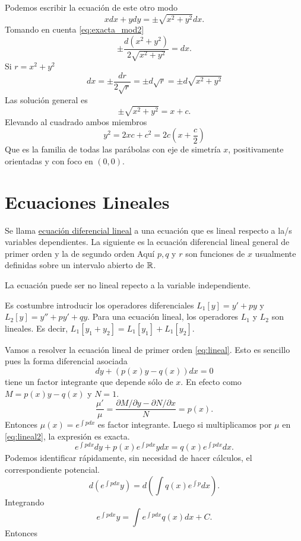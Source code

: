 Podemos escribir la ecuación de este otro modo
\[xdx+ydy=\pm\sqrt{x^2+y^2}dx.\]
Tomando en cuenta \eqref{eq:exacta_mod2}
\[\pm\frac{d(x^2+y^2)}{2\sqrt{x^2+y^2}}=dx.\]
Si $r=x^2+y^2$
\[dx=\pm\frac{dr}{2\sqrt{r}}=\pm d\sqrt{r}=\pm d\sqrt{x^2+y^2}\]
Las solución general es
\[\pm\sqrt{x^2+y^2}=x+c.\]
Elevando al cuadrado ambos miembros
\[y^2=2xc+c^2=2c\left(x+\frac{c}{2}\right)\]
Que es la familia de todas las parábolas con eje de simetría $x$, positivamente
orientadas y con foco en $(0,0)$.

\section{Ecuaciones Lineales}
\begin{definicion} Se llama \href{http://es.wikipedia.org/wiki/Ecuación_diferencial_lineal}{ecuación diferencial lineal} a una ecuación que es lineal
respecto a   la/s variables
dependientes. La siguiente es la ecuación diferencial lineal general de primer orden
y la  de segundo orden
Aquí $p,q$ y $r$ son funciones de $x$ usualmente definidas sobre un intervalo abierto de $\rr$.
\end{definicion}
La ecuación puede ser no lineal repecto a la variable independiente.

Es costumbre introducir los operadores  diferenciales $L_1[y]=y'+py$  y $ L_2[y]=y''+py'+qy$.
Para una ecuación lineal, los operadores $L_1$ y $L_2$ son lineales. Es decir, $L_1[y_1+y_2]=L_1[y_1]+L_1[y_2]$.


 Vamos a resolver la ecuación lineal de primer orden \eqref{eq:lineal}. Esto es sencillo pues la forma diferencial asociada
 \begin{equation}\label{eq:lineal2}dy+(p(x)y-q(x))dx=0
  \end{equation}
tiene un factor integrante que depende sólo de $x$. En efecto como $M=p(x)y-q(x)$ y $N=1$.
 \[\frac{\mu'}{\mu}=\frac{\partial M/\partial y-\partial N/\partial x}{N}=p(x).\]
 Entonces $\mu(x)=e^{\int pdx}$ es factor integrante. Luego si multiplicamos por $\mu$ en \eqref{eq:lineal2},  la expresión  es exacta.
 \[e^{\int pdx}dy+p(x)e^{\int pdx}ydx=q(x)e^{\int pdx}dx.\]
Podemos identificar rápidamente, sin necesidad de hacer cálculos, el correspondiente potencial.
 \[d\left(e^{\int pdx}y\right)=d\left(\int q(x)e^{\int p} dx \right).\]
Integrando
\[e^{\int pdx}y=\int e^{\int pdx}q(x)dx+C.
 \]
Entonces


